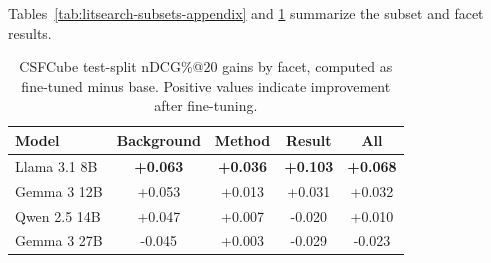 \documentclass[pdflatex,sn-basic,Numbered]{sn-jnl}%
\theoremstyle{thmstyleone}%
\theoremstyle{thmstyletwo}%
\theoremstyle{thmstylethree}%
\begin{document}
Tables~\ref{tab:litsearch-subsets-appendix} and
\ref{tab:csfcube-facet-gains-appendix} summarize the subset and facet results.

\begin{table}[htbp]


\centering
\scriptsize
{}


\caption{LitSearch primary cohort results by subset for fine-tuned models with
Qwen3-Embedding-8B as the first-stage retriever. IB/IS denote inline
broad/specific queries, while AB/AS denote author-written broad/specific queries.
Values are percentages.}
\label{tab:litsearch-subsets-appendix}
\end{table}

\begin{table}[htbp]


\centering
\scriptsize
\setlength{\tabcolsep}{3pt}
\begin{adjustbox}{max width=\linewidth}
\begin{tabular}{l c c c c}
\hline
Model & Background & Method & Result & All \\
\hline
Llama 3.1 8B     & \textbf{+0.063} & \textbf{+0.036} & \textbf{+0.103} & \textbf{+0.068} \\
Gemma 3 12B      & +0.053 & +0.013 & +0.031 & +0.032 \\
Qwen 2.5 14B     & +0.047 & +0.007 & -0.020 & +0.010 \\
Gemma 3 27B      & -0.045 & +0.003 & -0.029 & -0.023 \\
\hline
\end{tabular}
\end{adjustbox}


\caption{CSFCube test-split nDCG\%@$20$ gains by facet, computed as fine-tuned minus base. Positive values indicate improvement after fine-tuning.}
\label{tab:csfcube-facet-gains-appendix}
\end{table}
\end{document}
